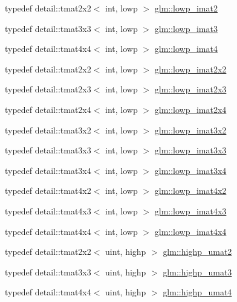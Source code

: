 \begin{CompactItemize}
typedef detail::tmat2x2$<$ int, lowp $>$ \hyperlink{group__gtc__matrix__integer_ge0df4bc278c1a958a32af9ac82c47630}{glm::lowp\_\-imat2}
\item 
typedef detail::tmat3x3$<$ int, lowp $>$ \hyperlink{group__gtc__matrix__integer_g149b90591e7275193c85cc08acbf0024}{glm::lowp\_\-imat3}
\item 
typedef detail::tmat4x4$<$ int, lowp $>$ \hyperlink{group__gtc__matrix__integer_g7c687f14d923e05d5cf14aac41d10993}{glm::lowp\_\-imat4}
\item 
typedef detail::tmat2x2$<$ int, lowp $>$ \hyperlink{group__gtc__matrix__integer_g05307630bc68a62132a82d1886a0b5e2}{glm::lowp\_\-imat2x2}
\item 
typedef detail::tmat2x3$<$ int, lowp $>$ \hyperlink{group__gtc__matrix__integer_g5757953c508a6e05bf3573d6c099cf88}{glm::lowp\_\-imat2x3}
\item 
typedef detail::tmat2x4$<$ int, lowp $>$ \hyperlink{group__gtc__matrix__integer_g4d859ef48cdfb15b2c9acc98064dd272}{glm::lowp\_\-imat2x4}
\item 
typedef detail::tmat3x2$<$ int, lowp $>$ \hyperlink{group__gtc__matrix__integer_g250780f2be05f698b881b04ba7ce0452}{glm::lowp\_\-imat3x2}
\item 
typedef detail::tmat3x3$<$ int, lowp $>$ \hyperlink{group__gtc__matrix__integer_ge0d6068aaf9b1f8f06c6cc32941f9471}{glm::lowp\_\-imat3x3}
\item 
typedef detail::tmat3x4$<$ int, lowp $>$ \hyperlink{group__gtc__matrix__integer_gba7c2c9f782278aaa10dad882d73ef0d}{glm::lowp\_\-imat3x4}
\item 
typedef detail::tmat4x2$<$ int, lowp $>$ \hyperlink{group__gtc__matrix__integer_g0d7055814ab969df3b844ba9c52dbf61}{glm::lowp\_\-imat4x2}
\item 
typedef detail::tmat4x3$<$ int, lowp $>$ \hyperlink{group__gtc__matrix__integer_g73858cf965b0aa7e72908eb817c192d6}{glm::lowp\_\-imat4x3}
\item 
typedef detail::tmat4x4$<$ int, lowp $>$ \hyperlink{group__gtc__matrix__integer_g92339a0b053a721e3b88267e6d175014}{glm::lowp\_\-imat4x4}
\item 
typedef detail::tmat2x2$<$ uint, highp $>$ \hyperlink{group__gtc__matrix__integer_g0c89800e3f63f82da4a4159004811cec}{glm::highp\_\-umat2}
\item 
typedef detail::tmat3x3$<$ uint, highp $>$ \hyperlink{group__gtc__matrix__integer_g2a271939d0123103f088e325e5123385}{glm::highp\_\-umat3}
\item 
typedef detail::tmat4x4$<$ uint, highp $>$ \hyperlink{group__gtc__matrix__integer_gf12f0d2744e809e64469d27ef392aa98}{glm::highp\_\-umat4}

\end{CompactItemize}

